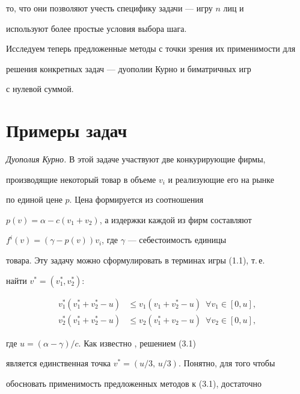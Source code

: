 то, что они позволяют учесть специфику задачи --- игру $n$ лиц и 


используют более простые условия выбора шага. 


 


Исследуем теперь предложенные методы с точки зрения их применимости для 


решения конкретных задач --- дуополии Курно \cite{5} и биматричных игр 


с нулевой суммой. 


 


\section{Примеры задач} 


 


{\it Дуополия Курно.} В этой задаче участвуют две конкурирующие фирмы, 


производящие некоторый товар в объеме $v_i$ и реализующие его на рынке 


по единой цене $p$. Цена формируется из соотношения 


$p(v)=\alpha-c(v_1+v_2)$, а издержки каждой из фирм составляют 


$f^i(v)=(\gamma-p(v))v_i$, где $\gamma$ --- себестоимость единицы 


товара. Эту задачу можно сформулировать в терминах игры (1.1), т.\,е. 


найти $v^*=(v^*_1,v^*_2)$: 


\begin{equation} 


\begin{split} 


v^*_1(v^*_1+v^*_2-u)&\le v_1(v_1+v^*_2-u)\ \; \forall v_1\in[0,u],\\ 


v^*_2(v^*_1+v^*_2-u)&\le v_2(v^*_1+v_2-u)\ \; \forall v_2\in[0,u], 


\end{split} 


\end{equation} 


где $u=(\alpha-\gamma)/c$. Как известно \cite{5}, решением (3.1) 


является единственная точка $v^*=(u/3,\,u/3)$. Понятно, для того чтобы 


обосновать применимость предложенных методов к (3.1), достаточно 


